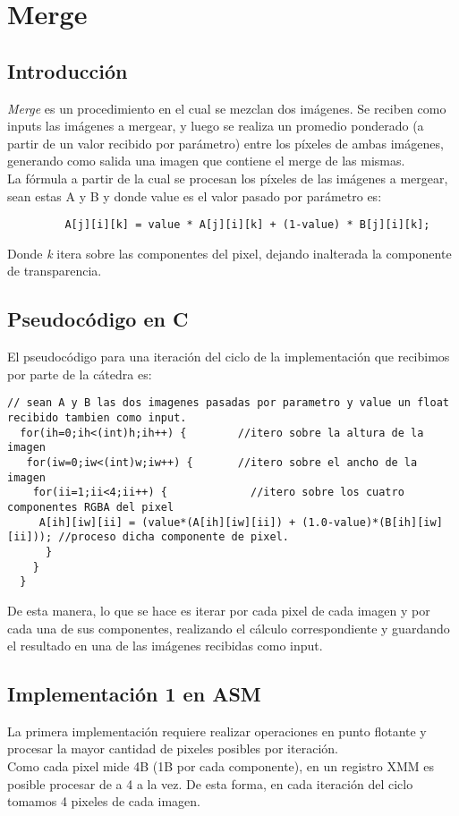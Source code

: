 \section{Merge}
\subsection{Introducción}
\textit{Merge} es un procedimiento en el cual se mezclan dos imágenes. Se reciben como inputs las imágenes a mergear, y luego se realiza un promedio ponderado (a partir de un valor recibido por parámetro) entre los píxeles de ambas imágenes, generando como salida una imagen que contiene el merge de las mismas.\\
La fórmula a partir de la cual se procesan los píxeles de las imágenes a mergear, sean estas A y B y donde value es el valor pasado por parámetro es:  

\begin{verbatim}
         A[j][i][k] = value * A[j][i][k] + (1-value) * B[j][i][k];
\end{verbatim}

Donde \textit{k} itera sobre las componentes del pixel, dejando inalterada la componente de transparencia.

\subsection{Pseudocódigo en C}

El pseudocódigo para una iteración del ciclo de la implementación que recibimos por parte de la cátedra es:

\begin{lstlisting}
// sean A y B las dos imagenes pasadas por parametro y value un float recibido tambien como input.
  for(ih=0;ih<(int)h;ih++) {		//itero sobre la altura de la imagen
   for(iw=0;iw<(int)w;iw++) {		//itero sobre el ancho de la imagen
    for(ii=1;ii<4;ii++) {			  //itero sobre los cuatro componentes RGBA del pixel
     A[ih][iw][ii] = (value*(A[ih][iw][ii]) + (1.0-value)*(B[ih][iw][ii])); //proceso dicha componente de pixel.
      }
    }
  }

\end{lstlisting}

De esta manera, lo que se hace es iterar por cada pixel de cada imagen y por cada una de sus componentes, realizando el cálculo correspondiente y guardando el resultado en una de las imágenes recibidas como input.

\subsection{Implementación 1 en ASM}
La primera implementación requiere realizar operaciones en punto flotante y procesar la mayor cantidad de pixeles posibles por iteración.\\
Como cada pixel mide 4B (1B por cada componente), en un registro XMM es posible procesar de a 4 a la vez. De esta forma, en cada iteración del ciclo tomamos 4 pixeles de cada imagen.

